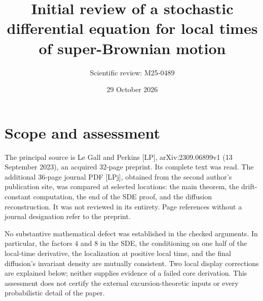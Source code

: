 \documentclass[10pt]{article}
\title{Initial review of a stochastic differential equation
for local times of super-Brownian motion}
\author{Scientific review: M25-0489}
\date{29 October 2026}
\begin{document}
\maketitle
\section*{Scope and assessment}
The principal source is Le Gall and Perkins [LP], arXiv:2309.06899v1 (13 September 2023), an acquired 32-page preprint. Its complete text was read. The additional 36-page journal PDF [LPj], obtained from the second author’s publication site, was compared at selected locations: the main theorem, the drift-constant computation, the end of the SDE proof, and the diffusion reconstruction. It was not reviewed in its entirety. Page references without a journal designation refer to the preprint.\par
No substantive mathematical defect was established in the checked arguments. In particular, the factors \(4\) and \(8\) in the SDE, the conditioning on one half of the local-time derivative, the localization at positive local time, and the final diffusion’s invariant density are mutually consistent. Two local display corrections are explained below; neither supplies evidence of a failed core derivation. This assessment does not certify the external excursion-theoretic inputs or every probabilistic detail of the paper.\par
\end{document}

